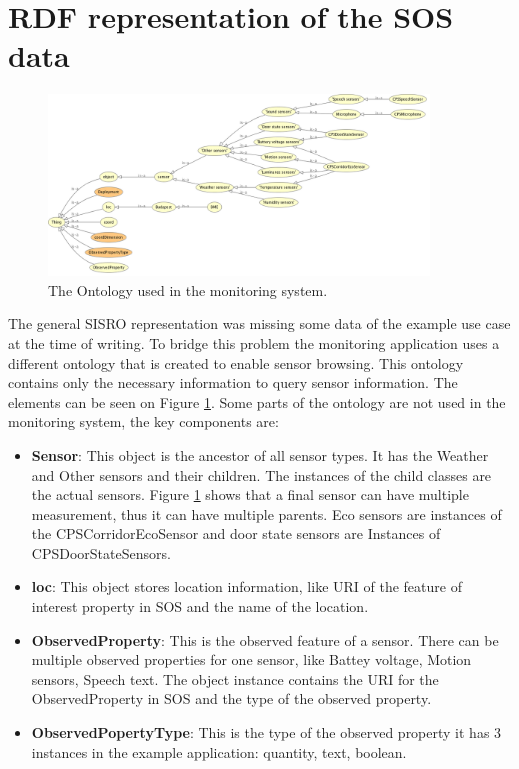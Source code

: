 \section{RDF representation of the SOS data}

\begin{figure}[h]
\centering
\includegraphics[width=0.9\textwidth]{figures/implrdf.png}
\caption{The Ontology used in the monitoring system.\label{fig:implrdf}}
\end{figure}

The general SISRO representation was missing some data of the example use case at the time of writing. To bridge this problem the monitoring application uses a different ontology that is created to enable sensor browsing. This ontology contains only the necessary information to query sensor information. The elements can be seen on Figure \ref{fig:implrdf}. Some parts of the ontology are not used in the monitoring system, the key components are:

\begin{itemize}
\item \textbf{Sensor}: This object is the ancestor of all sensor types. It has the Weather and Other sensors and their children. The instances of the child classes are the actual sensors. Figure \ref{fig:implrdf} shows that a final sensor can have multiple measurement, thus it can have multiple parents. Eco sensors are instances of the CPSCorridorEcoSensor and door state sensors are Instances of CPSDoorStateSensors. 
\item \textbf{loc}: This object stores location information, like URI of the feature of interest property in SOS and the name of the location. 
\item \textbf{ObservedProperty}: This is the observed feature of a sensor. There can be multiple observed properties for one sensor, like Battey voltage, Motion sensors, Speech text. The object instance contains the URI for the ObservedProperty in SOS and the type of the observed property.
\item \textbf{ObservedPopertyType}: This is the type of the observed property it has 3 instances in the example application: quantity, text, boolean.
\end{itemize}
 
